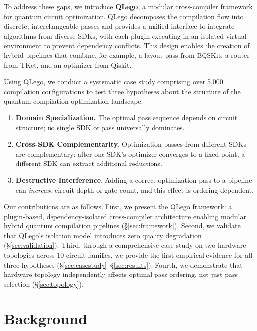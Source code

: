\documentclass[conference]{IEEEtran}
\begin{document}
To address these gaps, we introduce \textbf{QLego}, a modular cross-compiler framework for quantum circuit optimization.
QLego decomposes the compilation flow into discrete, interchangeable passes and provides a unified interface to integrate algorithms from diverse SDKs, with each plugin executing in an isolated virtual environment to prevent dependency conflicts.
This design enables the creation of hybrid pipelines that combine, for example, a layout pass from BQSKit, a router from TKet, and an optimizer from Qiskit.

Using QLego, we conduct a systematic case study comprising over 5,000 compilation configurations to test three hypotheses about the structure of the quantum compilation optimization landscape:

\begin{enumerate}[label=\textbf{H\arabic*},leftmargin=*]
    \item \textbf{Domain Specialization.} The optimal pass sequence depends on circuit structure; no single SDK or pass universally dominates.
    \item \textbf{Cross-SDK Complementarity.} Optimization passes from different SDKs are complementary: after one SDK's optimizer converges to a fixed point, a different SDK can extract additional reductions.
    \item \textbf{Destructive Interference.} Adding a correct optimization pass to a pipeline can \textit{increase} circuit depth or gate count, and this effect is ordering-dependent.
\end{enumerate}

Our contributions are as follows.
First, we present the QLego framework: a plugin-based, dependency-isolated cross-compiler architecture enabling modular hybrid quantum compilation pipelines (\S\ref{sec:framework}).
Second, we validate that QLego's isolation model introduces zero quality degradation (\S\ref{sec:validation}).
Third, through a comprehensive case study on two hardware topologies across 10 circuit families, we provide the first empirical evidence for all three hypotheses (\S\ref{sec:casestudy}--\S\ref{sec:results}).
Fourth, we demonstrate that hardware topology independently affects optimal pass ordering, not just pass selection (\S\ref{sec:topology}).

\section{Background}
\label{sec:background}
\end{document}
